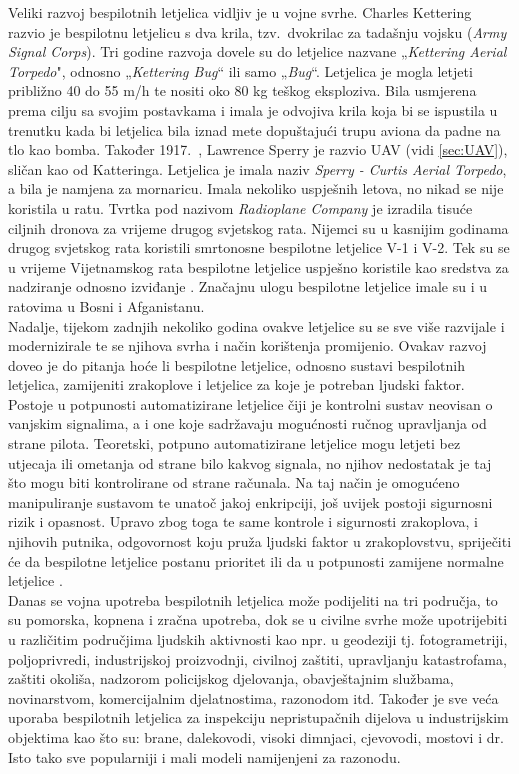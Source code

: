 \documentclass[times, utf8, diplomski]{fer}
\begin{document}
Veliki razvoj bespilotnih letjelica vidljiv je u vojne svrhe. Charles  Kettering  razvio  je  bespilotnu  letjelicu  s  dva  krila, tzv.~dvokrilac za tadašnju vojsku (\emph{Army Signal Corps}). Tri godine razvoja dovele su do letjelice nazvane „\emph{Kettering Aerial Torpedo}", odnosno „\emph{Kettering Bug}“ ili samo „\emph{Bug}“. Letjelica je mogla letjeti približno 40 do 55 m/h te nositi oko 80 kg teškog eksploziva. Bila usmjerena prema cilju sa svojim postavkama i imala  je  odvojiva  krila  koja  bi  se ispustila u  trenutku kada  bi  letjelica  bila iznad  mete dopuštajući trupu aviona da padne na tlo kao bomba.  Također 1917.~, Lawrence Sperry je razvio UAV (vidi \ref{sec:UAV}), sličan kao od Katteringa. Letjelica je imala naziv \emph{Sperry - Curtis Aerial Torpedo}, a bila je namjena za mornaricu. Imala nekoliko uspješnih letova, no nikad se nije koristila u ratu. Tvrtka pod nazivom \emph{Radioplane Company} je izradila tisuće ciljnih dronova  za vrijeme drugog svjetskog rata. Nijemci su u kasnijim godinama drugog svjetskog rata koristili smrtonosne bespilotne letjelice V-1 i V-2. Tek su se u vrijeme Vijetnamskog rata bespilotne letjelice uspješno koristile kao sredstva za nadziranje odnosno izviđanje \citep{UAVSystems}. Značajnu ulogu bespilotne letjelice imale su i u ratovima u Bosni i Afganistanu.\\
Nadalje, tijekom zadnjih nekoliko godina ovakve letjelice su se sve više razvijale i modernizirale te se njihova svrha i način korištenja promijenio. Ovakav razvoj doveo je do pitanja hoće li bespilotne letjelice, odnosno sustavi bespilotnih letjelica, zamijeniti zrakoplove i letjelice za koje je potreban ljudski faktor. Postoje u potpunosti automatizirane letjelice čiji je kontrolni sustav neovisan o vanjskim signalima, a i one koje sadržavaju mogućnosti ručnog upravljanja  od  strane  pilota.  Teoretski,  potpuno  automatizirane  letjelice  mogu  letjeti  bez utjecaja ili ometanja od strane bilo kakvog signala, no njihov nedostatak je taj što mogu biti kontrolirane od strane računala. Na taj način je omogućeno manipuliranje sustavom te unatoč jakoj enkripciji,  još  uvijek  postoji  sigurnosni  rizik  i  opasnost.  Upravo  zbog  toga  te  same kontrole  i  sigurnosti  zrakoplova, i njihovih putnika, odgovornost koju pruža ljudski faktor u zrakoplovstvu, spriječiti će da bespilotne letjelice postanu prioritet ili da u potpunosti zamijene normalne letjelice \citep{UAVSystems}.\\
Danas se vojna upotreba bespilotnih letjelica može podijeliti na tri područja, to su pomorska, kopnena i zračna upotreba, dok se u civilne  svrhe  može  upotrijebiti  u  različitim  područjima ljudskih  aktivnosti  kao  npr.  u  geodeziji  tj. fotogrametriji,   poljoprivredi,   industrijskoj proizvodnji,  civilnoj  zaštiti,  upravljanju katastrofama,  zaštiti  okoliša,  nadzorom policijskog    djelovanja,    obavještajnim službama,   novinarstvom,   komercijalnim djelatnostima, razonodom itd. Također  je  sve  veća  uporaba  bespilotnih letjelica za inspekciju   nepristupačnih dijelova  u industrijskim  objektima  kao  što su: brane, dalekovodi, visoki dimnjaci, cjevovodi, mostovi i dr. Isto tako sve popularniji i mali modeli namijenjeni za razonodu.
\end{document}
